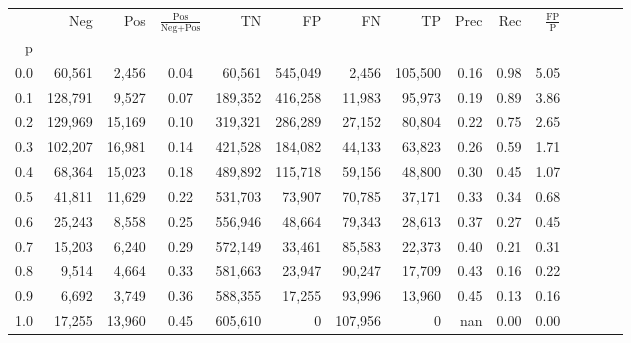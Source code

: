 \begin{tabular}{rrrcrrrrrrrrrrr}
\toprule
{} &      Neg &     Pos & $\frac{\text{Pos}}{\text{Neg}+\text{Pos}}$ &       TN &       FP &       FN &       TP &  Prec &   Rec & $\frac{\text{FP}}{\text{P}}$ \\
p   &          &         &                                            &          &          &          &          &       &       &                              \\
\midrule
0.0 &   60,561 &   2,456 &                                       0.04 &   60,561 &  545,049 &    2,456 &  105,500 &  0.16 &  0.98 &                         5.05 \\
0.1 &  128,791 &   9,527 &                                       0.07 &  189,352 &  416,258 &   11,983 &   95,973 &  0.19 &  0.89 &                         3.86 \\
0.2 &  129,969 &  15,169 &                                       0.10 &  319,321 &  286,289 &   27,152 &   80,804 &  0.22 &  0.75 &                         2.65 \\
0.3 &  102,207 &  16,981 &                                       0.14 &  421,528 &  184,082 &   44,133 &   63,823 &  0.26 &  0.59 &                         1.71 \\
0.4 &   68,364 &  15,023 &                                       0.18 &  489,892 &  115,718 &   59,156 &   48,800 &  0.30 &  0.45 &                         1.07 \\
0.5 &   41,811 &  11,629 &                                       0.22 &  531,703 &   73,907 &   70,785 &   37,171 &  0.33 &  0.34 &                         0.68 \\
0.6 &   25,243 &   8,558 &                                       0.25 &  556,946 &   48,664 &   79,343 &   28,613 &  0.37 &  0.27 &                         0.45 \\
0.7 &   15,203 &   6,240 &                                       0.29 &  572,149 &   33,461 &   85,583 &   22,373 &  0.40 &  0.21 &                         0.31 \\
0.8 &    9,514 &   4,664 &                                       0.33 &  581,663 &   23,947 &   90,247 &   17,709 &  0.43 &  0.16 &                         0.22 \\
0.9 &    6,692 &   3,749 &                                       0.36 &  588,355 &   17,255 &   93,996 &   13,960 &  0.45 &  0.13 &                         0.16 \\
1.0 &   17,255 &  13,960 &                                       0.45 &  605,610 &        0 &  107,956 &        0 &   nan &  0.00 &                         0.00 \\
\bottomrule
\end{tabular}
